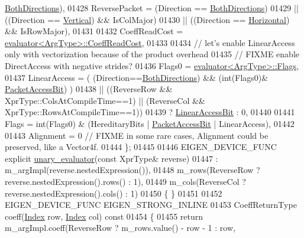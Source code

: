 \begin{DoxyCode}
      \hyperlink{group__enums_ggad49a7b3738e273eb00932271b36127f7aa01e40fce022901560ce6d9fdee2fde3}{BothDirections}),
01428     ReversePacket = (Direction == \hyperlink{group__enums_ggad49a7b3738e273eb00932271b36127f7aa01e40fce022901560ce6d9fdee2fde3}{BothDirections})
01429                     || ((Direction == \hyperlink{group__enums_ggad49a7b3738e273eb00932271b36127f7addca718e0564723df21d61b94b1198be}{Vertical})   && IsColMajor)
01430                     || ((Direction == \hyperlink{group__enums_ggad49a7b3738e273eb00932271b36127f7aae8a16b3b9272683c1162915f6d892be}{Horizontal}) && IsRowMajor),
01431                     
01432     CoeffReadCost = \hyperlink{struct_eigen_1_1internal_1_1evaluator}{evaluator<ArgType>::CoeffReadCost},
01433     
01434     \textcolor{comment}{// let's enable LinearAccess only with vectorization because of the product overhead}
01435     \textcolor{comment}{// FIXME enable DirectAccess with negative strides?}
01436     Flags0 = \hyperlink{struct_eigen_1_1internal_1_1evaluator}{evaluator<ArgType>::Flags},
01437     LinearAccess = ( (Direction==\hyperlink{group__enums_ggad49a7b3738e273eb00932271b36127f7aa01e40fce022901560ce6d9fdee2fde3}{BothDirections}) && (int(Flags0)&
      \hyperlink{group__flags_ga1a306a438e1ab074e8be59512e887b9f}{PacketAccessBit}) )
01438                   || ((ReverseRow && XprType::ColsAtCompileTime==1) || (ReverseCol && 
      XprType::RowsAtCompileTime==1))
01439                  ? \hyperlink{group__flags_ga4b983a15d57cd55806df618ac544d09e}{LinearAccessBit} : 0,
01440 
01441     Flags = \textcolor{keywordtype}{int}(Flags0) & (HereditaryBits | \hyperlink{group__flags_ga1a306a438e1ab074e8be59512e887b9f}{PacketAccessBit} | LinearAccess),
01442     
01443     Alignment = 0 \textcolor{comment}{// FIXME in some rare cases, Alignment could be preserved, like a Vector4f.}
01444   \};
01445 
01446   EIGEN\_DEVICE\_FUNC \textcolor{keyword}{explicit} \hyperlink{struct_eigen_1_1internal_1_1unary__evaluator}{unary\_evaluator}(\textcolor{keyword}{const} XprType& reverse)
01447     : m\_argImpl(reverse.nestedExpression()),
01448       m\_rows(ReverseRow ? reverse.nestedExpression().rows() : 1),
01449       m\_cols(ReverseCol ? reverse.nestedExpression().cols() : 1)
01450   \{ \}
01451  
01452   EIGEN\_DEVICE\_FUNC EIGEN\_STRONG\_INLINE
01453   CoeffReturnType coeff(\hyperlink{namespace_eigen_a62e77e0933482dafde8fe197d9a2cfde}{Index} row, \hyperlink{namespace_eigen_a62e77e0933482dafde8fe197d9a2cfde}{Index} col)\textcolor{keyword}{ const}
01454 \textcolor{keyword}{  }\{
01455     \textcolor{keywordflow}{return} m\_argImpl.coeff(ReverseRow ? m\_rows.value() - row - 1 : row,

\end{DoxyCode}
